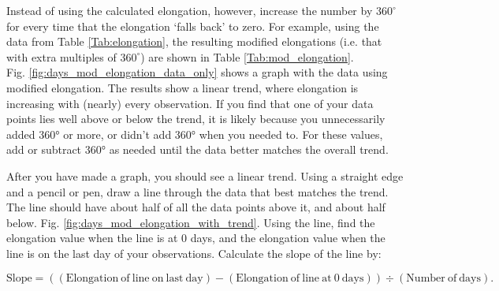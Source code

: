 \documentclass{exam}
\newcommand{\BE}{\begin{equation}}
\newcommand{\EE}{\end{equation}}
\begin{document}
Instead of using the calculated elongation, however, increase the number by $360^\circ$ for every time that the elongation `falls back' to zero.  For example, using the data from Table \ref{Tab:elongation}, the resulting modified elongations (i.e. that with extra multiples of $360^\circ$) are shown in Table \ref{Tab:mod_elongation}.\\

Fig. \ref{fig:days_mod_elongation_data_only} shows a graph with the data using modified elongation. The results show a linear trend, where elongation is increasing with (nearly) every observation. If you find that one of your data points lies well above or below the trend, it is likely because you unnecessarily added 360° or more, or didn't add 360° when you needed to. For these values, add or subtract 360° as needed until the data better matches the overall trend.


After you have made a graph, you should see a linear trend. Using a straight edge and a pencil or pen, draw a line through the data that best matches the trend. The line should have about half of all the data points above it, and about half below. Fig. \ref{fig:days_mod_elongation_with_trend}. Using the line, find the elongation value when the line is at 0 days, and the elongation value when the line is on the last day of your observations. Calculate the slope of the line by:

\BE \mathrm{Slope} = ((\mathrm{Elongation~of~line~on~last~day}) - (\mathrm{Elongation~of~line~at~0~days})) \div (\mathrm{Number~of~days}). \EE
\end{document}

